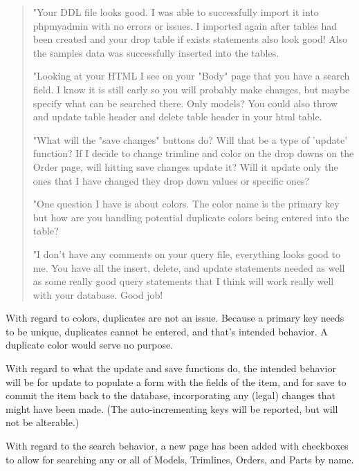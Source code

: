 \documentclass[11pt,letterpaper,oneside]{amsart}
\begin{document}
\begin{tcolorbox} \begin{quotation} 

"Your DDL file looks good. I was able to successfully import it into phpmyadmin with no errors or issues. I imported again after tables had been created and your drop table if exists statements also look good! Also the samples data was successfully inserted into the tables.

"Looking at your HTML I see on your "Body" page that you have a search field. I know it is still early so you will probably make changes, but maybe specify what can be searched there. Only models? You could also throw and update table header and delete table header in your html table.

"What will the "save changes" buttons do? Will that be a type of 'update' function? If I decide to change trimline and color on the drop downs on the Order page, will hitting save changes update it? Will it update only the ones that I have changed they drop down values or specific ones?

"One question I have is about colors. The color name is the primary key but how are you handling potential duplicate colors being entered into the table?

"I don't have any comments on your query file, everything looks good to me. You have all the insert, delete, and update statements needed as well as some really good query statements that I think will work really well with your database. Good job!

\end{quotation} \end{tcolorbox}

With regard to colors, duplicates are not an issue.  Because a primary key needs to be unique, duplicates cannot be entered, and that's intended behavior.  A duplicate color would serve no purpose.

With regard to what the update and save functions do, the intended behavior will be for update to populate a form with the fields of the item, and for save to commit the item back to the database, incorporating any (legal) changes that might have been made.  (The auto-incrementing keys will be reported, but will not be alterable.)

With regard to the search behavior, a new page has been added with checkboxes to allow for searching any or all of Models, Trimlines, Orders, and Parts by name.
\end{document}
